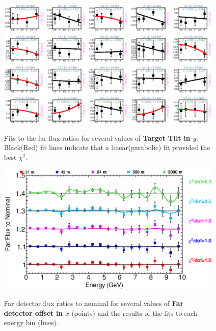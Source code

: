 \begin{figure}[ht]
  \begin{center}
    {\includegraphics[width=5.0in]{figures/TargetYTilt_far_fits.eps}}
  \end{center}
\caption{ Fits to the far flux ratios for several values of {\bf Target Tilt in $y$}. Black(Red) fit lines indicate that a linear(parabolic) fit provided the best $\chi^2$. }
\end{figure}


\begin{figure}[ht]
  \begin{center}
    {\includegraphics[width=6.0in]{figures/LBNEFDX_far_summary.eps}}
  \end{center}
\caption{ Far detector flux ratios to nominal for several values of {\bf Far detector offset in $x$} (points) and the results of the fits to each energy bin (lines).}
\end{figure}

